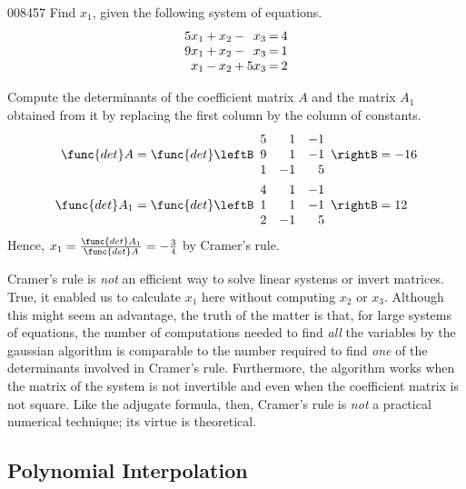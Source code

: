 \begin{example}{}{008457}
Find $x_{1}$, given the following system of equations.
\begin{equation*}
\arraycolsep=1pt
\begin{array}{rrrrrrr}
 	 5x_1 & + & x_2 & - & x_3  & = & 4\\
	9x_1& + & x_2 & - & x_3 & = & 1 \\
	x_1& - & x_2 & + & 5x_3 & = & 2 \\
\end{array}
\end{equation*}
\vspace{0em}
\begin{solution}
  Compute the determinants of the coefficient matrix $A$ and the matrix $A_{1}$ obtained from it by replacing the first column by the column of constants.
\begin{align*}
\func{det } A &= \func{det} \leftB \begin{array}{rrr}
5 & 1 & -1 \\
9 & 1 & -1 \\
1 & -1 & 5 
\end{array}\rightB  = -16 \\
\func{det } A_1 &= \func{det} \leftB \begin{array}{rrr}
4 & 1 & -1 \\
1 & 1 & -1 \\
2 & -1 & 5 
\end{array}\rightB  = 12
\end{align*}
Hence, $x_1 = \frac{\func{det } A_1}{\func{det } A} = -\frac{3}{4}$
 by Cramer's rule.
\end{solution}
\end{example}

Cramer's rule is \textit{not} an efficient way to solve linear systems or invert matrices. True, it enabled us to calculate $x_{1}$ here without computing $x_{2}$ or $x_{3}$.
 Although this might seem an advantage, the truth of the matter is that,
 for large systems of equations, the number of computations needed to 
find \textit{all} the variables by the gaussian algorithm is comparable to the number required to find \textit{one}  of the determinants involved in Cramer's rule. Furthermore, the 
algorithm works when the matrix of the system is not invertible and even
 when the coefficient matrix is not square. Like the adjugate formula, 
then, Cramer's rule is \textit{not} a practical numerical technique; its virtue is theoretical.

\subsection*{Polynomial Interpolation}

